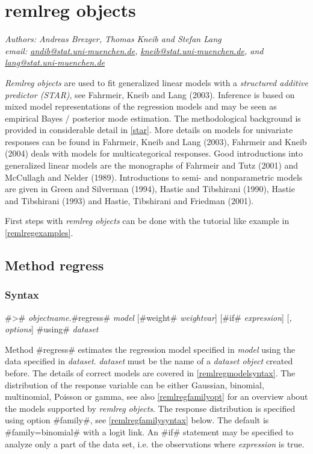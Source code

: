 \chapter{remlreg objects}\normalsize
\label{remlreg} 

{\em Authors: Andreas Brezger, Thomas Kneib and Stefan Lang} \\
{\em email:
\href{mailto:andib@stat.uni-muenchen.de}{andib@stat.uni-muenchen.de},
\href{mailto:kneib@stat.uni-muenchen.de}{kneib@stat.uni-muenchen.de},
and
\href{mailto:lang@stat.uni-muenchen.de}{lang@stat.uni-muenchen.de}} \\
\vspace{0.3cm}

{\em Remlreg objects} are used to fit generalized linear models
with a {\em structured additive predictor (STAR)}, see Fahrmeir,
Kneib and Lang (2003). Inference is based on mixed model
representations of the regression models and may be seen as
empirical Bayes / posterior mode estimation. The methodological
background is provided in considerable detail in \autoref{star}.
More details on models for univariate responses can be found in
Fahrmeir, Kneib and Lang (2003), Fahrmeir and Kneib (2004) deals
with models for multicategorical responses. Good introductions
into generalized linear models are the monographs of Fahrmeir and
Tutz (2001) and McCullagh and Nelder (1989). Introductions to
semi- and nonparametric models are given in Green and Silverman
(1994), Hastie and Tibshirani (1990), Hastie and Tibshirani (1993)
and Hastie, Tibshirani and Friedman (2001).

First steps with {\em remlreg objects} can be done with the
tutorial like example in \autoref{remlregexamples}.

\section{Method regress}
\label{remlregregress}

\subsection{Syntax}
\label{remlregregresssyntax}

 #># {\em objectname}.#regress# {\em model} [#weight# {\em weightvar}] [#if# {\em expression}] [{\em , options}] #using# {\em dataset}

Method #regress# estimates the regression model specified in {\em
model} using the data specified in {\em dataset}. {\em dataset}
must be the name of a {\em dataset object} created before. The
details of correct models are covered in
\autoref{remlregmodelsyntax}. The distribution of the response
variable can be either Gaussian, binomial, multinomial, Poisson or
gamma, see also \autoref{remlregfamilyopt} for an overview about
the models supported by {\em remlreg objects}. The response
distribution is specified using option #family#, see
\autoref{remlregfamilysyntax} below. The default is
#family=binomial# with a logit link. An #if# statement may be
specified to analyze only a part of the data set, i.e. the
observations where {\em expression} is true.

